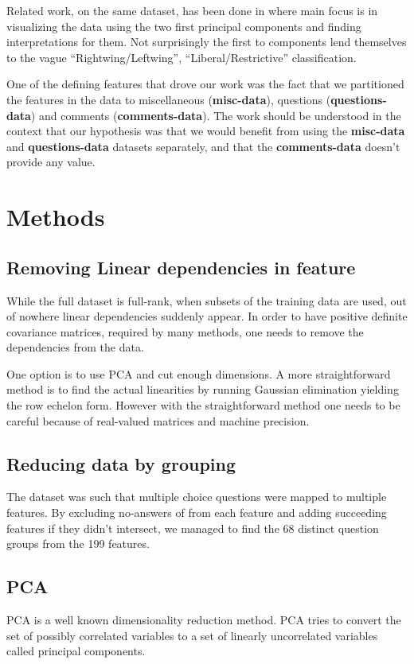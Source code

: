 \documentclass[a4paper,10pt]{article}
\begin{document}
Related work, on the same dataset, has been done \cite{Talonen:2011:APE:2075337.2075371} in where main focus is in visualizing the data using the two first principal components and finding interpretations for them. Not surprisingly the first to components lend themselves to the vague “Rightwing/Leftwing”, “Liberal/Restrictive” classification. 

One of the defining features that drove our work was the fact that we partitioned the features in the data to miscellaneous ({\bf misc-data}), questions ({\bf questions-data}) and comments ({\bf comments-data}). The work should be understood in the context that our hypothesis was that we would benefit from using the {\bf misc-data} and {\bf questions-data} datasets separately, and that the {\bf comments-data} doesn’t provide any value.

\section{Methods}
\subsection{Removing Linear dependencies in feature}
While the full dataset is full-rank, when subsets of the training data are used, out of nowhere linear dependencies suddenly appear. In order to have positive definite covariance matrices, required by many methods, one needs to remove the dependencies from the data.

One option is to use PCA and cut enough dimensions. A more straightforward method is to find the actual linearities by running Gaussian elimination yielding the row echelon form. However with the straightforward method one needs to be careful because of real-valued matrices and machine precision.

\subsection{Reducing data by grouping}
The dataset was such that multiple choice questions were mapped to multiple features. By excluding no-answers of from each feature and adding succeeding features if they didn’t intersect, we managed to find the 68 distinct question groups from the 199 features.

\subsection{PCA}
PCA is a well known dimensionality reduction method. PCA tries to convert the set of possibly correlated variables to a set of linearly uncorrelated variables called principal components.
\end{document}
